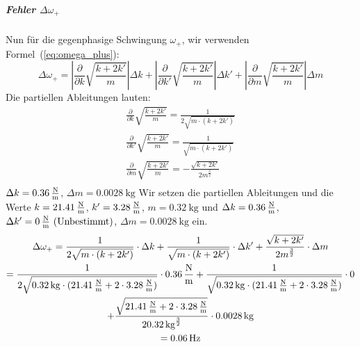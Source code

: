 \documentclass{article}
\begin{document}
                  \subparagraph{Fehler \(\Delta \omega_{+}\)}
                  Nun für die gegenphasige Schwingung \(\omega_{+}\), wir verwenden Formel~(\ref{eq:omega_plus}):
                  \begin{equation}
                      \Delta \omega_{+} = \left| \frac{\partial}{\partial k} \sqrt{\frac{k + 2k'}{m}} \right| \Delta k + \left| \frac{\partial}{\partial k'} \sqrt{\frac{k + 2k'}{m}} \right| \Delta k'
                      + \left| \frac{\partial}{\partial m} \sqrt{\frac{k + 2k'}{m}} \right| \Delta m
                  \end{equation}
                  Die partiellen Ableitungen lauten:
                  \begin{equation}
                      \begin{gathered}
                          \frac{\partial}{\partial k} \sqrt{\frac{k + 2k'}{m}} = \frac{1}{2 \sqrt{m \cdot ( k + 2k') }} \\
                          \frac{\partial}{\partial k'} \sqrt{\frac{k + 2k'}{m}} = \frac{1}{ \sqrt{m \cdot ( k + 2k') }} \\
                          \frac{\partial}{\partial m} \sqrt{\frac{k + 2k'}{m}} = - \frac{\sqrt{k + 2k'} }{2 m^{\frac{3}{2}}} \\
                      \end{gathered}
                  \end{equation}
                  \(\Delta k = \SI{0.36}{\frac{\newton}{\metre}} \), \(\Delta m = \SI{0.0028}{\kilogram} \)
                  Wir setzen die partiellen Ableitungen und die Werte \(k = \SI{21.41}{\frac{\newton}{\metre}} \), \(k' = \SI{3.28}{\frac{\newton}{\metre}} \), \(m = \SI{0.32}{\kilogram} \)
                  und \(\Delta k = \SI{0.36}{\frac{\newton}{\metre}} \), \(\Delta k' = \SI{0}{\frac{\newton}{\metre}} \text{ (Unbestimmt)}\), \(\Delta m = \SI{0.0028}{\kilogram} \) ein.
                  \begin{equation}
                      \begin{gathered}
                          \Delta \omega_{+} = \frac{1}{2 \sqrt{m \cdot ( k + 2k') }} \cdot \Delta k + \frac{1}{ \sqrt{m \cdot ( k + 2k') }} \cdot \Delta k'
                          + \frac{\sqrt{k + 2k'} }{2 m^{\frac{3}{2}}} \cdot \Delta m \\
                          = \frac{1}{2 \sqrt{ \SI{0.32}{\kilogram} \cdot ( \SI{21.41}{\frac{\newton}{\metre}} + 2 \cdot \SI{3.28}{\frac{\newton}{\metre}}) }} \cdot \SI{0.36}{\frac{\newton}{\metre}} +
                          \frac{1}{ \sqrt{ \SI{0.32}{\kilogram} \cdot ( \SI{21.41}{\frac{\newton}{\metre}} + 2 \cdot \SI{3.28}{\frac{\newton}{\metre}} ) }} \cdot 0 \\
                          + \frac{\sqrt{\SI{21.41}{\frac{\newton}{\metre}} + 2 \cdot \SI{3.28}{\frac{\newton}{\metre}} } }{2 \SI{0.32}{\kilogram}^{\frac{3}{2}}} \cdot \SI{0.0028}{\kilogram} \\
                          = \SI{0.06}{\hertz} %
                      \end{gathered}
                  \end{equation}
\end{document}
